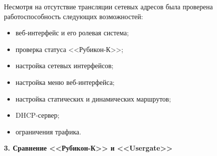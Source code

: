 Несмотря на отсутствие трансляции сетевых адресов была проверена работоспособность следующих возможностей:
\begin{itemize}
	\item веб-интерфейс и его ролевая система;
	
	\item проверка статуса <<Рубикон-К>>;
	
	\item настройка сетевых интерфейсов;
	
	\item настройка меню веб-интерфейса;
	
	\item настройка статических и динамических маршрутов;
	
	\item DHCP-сервер;
	
	\item ограничения трафика.
\end{itemize}

\newpage

\begin{center}
	\textbf{\Large 3. Сравнение <<Рубикон-К>> и <<Usergate>>}
\end{center}

